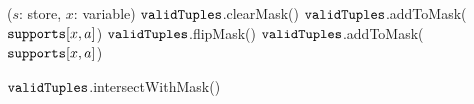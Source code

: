 \PROCEDURE \UpdateTable($s$: store, $x$: variable) \label{line:updateTableDelta:1} 
        \STATE $\texttt{validTuples}$.clearMask() \label{line:updateTableDelta:4} 
           \label{line:updateTableDelta:5} 
            \STATE $\texttt{validTuples}$.addToMask($\texttt{supports}[x,a]$) \label{line:updateTableDelta:6} 
          \ENDFOREACH      
          \STATE $\texttt{validTuples}$.flipMask() \label{line:updateTableDelta:7} 
        \ELSE
           \label{line:updateTableDelta:8} 
            \STATE $\texttt{validTuples}$.addToMask($\texttt{supports}[x,a]$) \label{line:updateTableDelta:9} 
          \ENDFOREACH      

        \ENDIF
        \STATE $\texttt{validTuples}$.intersectWithMask() \label{line:updateTable:10} 
